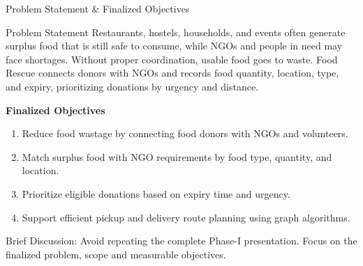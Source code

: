 \documentclass[aspectratio=169,11pt]{beamer}
\newcommand{\smallnote}[1]{%
\vspace{0.08cm}
{\scriptsize\color{GEUGrey}#1}
}
\begin{document}
\begin{frame}{Problem Statement \& Finalized Objectives}

\begin{block}{Problem Statement}
Restaurants, hostels, households, and events often generate surplus food that is still safe to consume, while NGOs and people in need may face shortages. Without proper coordination, usable food goes to waste. Food Rescue connects donors with NGOs and records food quantity, location, type, and expiry, prioritizing donations by urgency and distance.
\end{block}

\vspace{2mm}

\textbf{\color{GEUBlue}Finalized Objectives}

\begin{enumerate}\itemsep3pt
\item Reduce food wastage by connecting food donors with NGOs and volunteers.
\item Match surplus food with NGO requirements by food type, quantity, and location.
\item Prioritize eligible donations based on expiry time and urgency.
\item Support efficient pickup and delivery route planning using graph algorithms.
\end{enumerate}

\vfill

\smallnote{
Brief Discussion: Avoid repeating the complete Phase-I presentation.
Focus on the finalized problem, scope and measurable objectives.
}

\end{frame}
\end{document}
